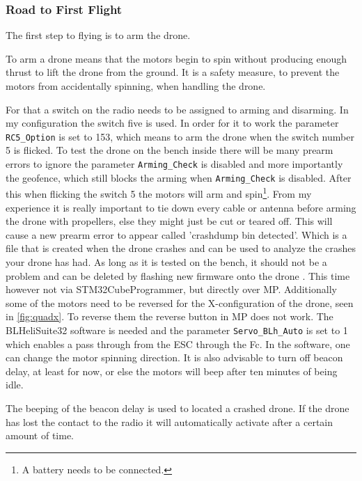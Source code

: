 \documentclass[svgnames]{article}
\begin{document}
	\subsubsection{Road to First Flight}
	The first step to flying is to arm the drone.
	\begin{Explanation}[to arm]
		\item To arm a drone means that the motors begin to spin without producing enough thrust to lift the drone from the ground. It is a safety measure, to prevent the motors from accidentally spinning, when handling the drone.
	\end{Explanation}
	For that a switch on the radio needs to be assigned to arming and disarming. In my configuration the switch five is used. In order for it to work the parameter \lstinline|RC5_Option| is set to 153, which means to arm the drone when the switch number 5 is flicked. To test the drone on the bench inside there will be many prearm errors to ignore the parameter \lstinline|Arming_Check| is disabled and more importantly the geofence, which still blocks the arming when \lstinline|Arming_Check| is disabled. 
	After this when flicking the switch 5 the motors will arm and spin\footnote{A battery needs to be connected.}. From my experience it is really important to tie down every cable or antenna before arming the drone with propellers, else they might just be cut or teared off. This will cause a new prearm error to appear called 'crashdump bin detected'. Which is a file that is created when the drone crashes and can be used to analyze the crashes your drone has had. As long as it is tested on the bench, it should not be a problem and can be deleted by flashing new firmware onto the drone \cite{blogcrashdump}. This time however not via STM32CubeProgrammer, but directly over \gls{MP}. Additionally some of the motors need to be reversed for the X-configuration of the drone, seen in \cref{fig:quadx}. To reverse them the reverse button in \gls{MP} does not work. The BLHeliSuite32 software is needed and the parameter \lstinline|Servo_BLh_Auto| is set to 1 which enables a pass through from the \gls{ESC} through the \gls{Fc}. In the software, one can change the motor spinning direction. It is also advisable to turn off beacon delay, at least for now, or else the motors will beep after ten minutes of being idle.
	\begin{Explanation}
		\item The beeping of the beacon delay is used to located a crashed drone. If the drone has lost the contact to the radio it will automatically activate after a certain amount of time.
	\end{Explanation}
	
\end{document}
